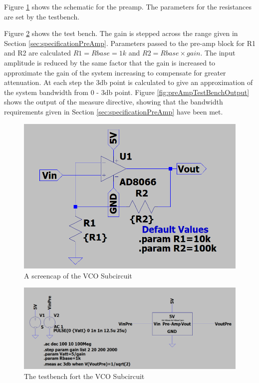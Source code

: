Figure \ref{fig:preAmpSchematic} shows the schematic for the preamp.
The parameters for the resistances are set by the testbench.

Figure \ref{fig:preAmpTestBench} shows the test bench. 
The gain is stepped across the range given in Section \ref{sec:specificationPreAmp}.
Parameters passed to the pre-amp block for R1 and R2 are calculated \(R1 = Rbase = 1k\) and \(R2 = Rbase \times gain\).
The input amplitude is reduced by the same factor that the gain is increased to approximate the gain of the system increasing to compensate for greater attenuation.
At each step the 3db point is calculated to give an approximation of the system bandwidth from 0 - 3db point. 
Figure \ref{fig:preAmpTestBenchOutput} shows the output of the measure directive, showing that the bandwidth requirements given in Section \ref{sec:specificationPreAmp} have been met.  

\begin{figure}[H]
    \centering 
    \includegraphics[width=\textwidth]{../Circuits/Images/Pre-Amp/Schematic}
    \caption{A screencap of the VCO Subcircuit}
    \label{fig:preAmpSchematic}
\end{figure}

\begin{figure}[H]
    \centering 
    \includegraphics[width=\textwidth]{../Circuits/Images/Pre-Amp/TestBenchScreencap}
    \caption{The testbench fort the VCO Subcircuit}
    \label{fig:preAmpTestBench}
\end{figure}


